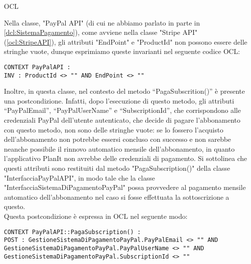 \begin{listaPersonale}{OCL}
    \begin{center}
        
    \end{center}
    Nella classe, "PayPal API" (di cui ne abbiamo parlato in parte in \ref{dcl:SistemaPagamento}), come avviene nella classe "Stripe API" (\ref{ocl:StripeAPI}), gli attributi "EndPoint" e "ProductId" non possono essere delle stringhe vuote, dunque esprimiamo queste invarianti nel seguente codice OCL:
    \begin{lstlisting}
CONTEXT PayPalAPI :
INV : ProductId <> "" AND EndPoint <> ""
    \end{lstlisting}
    Inoltre, in questa classe, nel contesto del metodo “PagaSubscrition()” è presente una postcondizione. Infatti, dopo l'esecuzione di questo metodo, gli attributi “PayPalEmail”, “PayPalUserName” e “SubscriptionId”, che corrispondono alle credenziali PayPal dell'utente autenticato, che decide di pagare l'abbonamento con questo metodo, non sono delle stringhe vuote: se lo fossero l'acquisto dell'abbonamento non potrebbe essersi concluso con successo e non sarebbe neanche possibile il rinnovo automatico mensile dell'abbonamento, in quanto l'applicativo PlanIt non avrebbe delle credenziali di pagamento. Si sottolinea che questi attributi sono restituiti dal metodo "PagaSubscription()" della classe "InterfacciaPayPalAPI", in modo tale che la classe "InterfacciaSistemaDiPagamentoPayPal" possa provvedere al pagamento mensile automatico dell'abbonamento nel caso si fosse effettuata la sottoscrizione a questo.\\
    Questa postcondizione è espressa in OCL nel seguente modo:
    \begin{lstlisting}
CONTEXT PayPalAPI::PagaSubscription() :
POST : GestioneSistemaDiPagamentoPayPal.PayPalEmail <> "" AND GestioneSistemaDiPagamentoPayPal.PayPalUserName <> "" AND GestioneSistemaDiPagamentoPayPal.SubscriptionId <> ""
    \end{lstlisting}
    \newpage





\end{listaPersonale}

